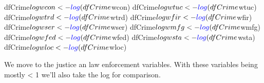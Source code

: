 \documentclass[]{article}
\newenvironment{Shaded}{}{}
\newcommand{\KeywordTok}[1]{\textcolor[rgb]{0.00,0.00,1.00}{#1}}
\newcommand{\NormalTok}[1]{#1}
\newcommand{\OperatorTok}[1]{#1}
\begin{document}
\begin{Shaded}
\begin{Highlighting}[]
\NormalTok{dfCrime}\OperatorTok{$}\NormalTok{logwcon<-}\KeywordTok{log}\NormalTok{(dfCrime}\OperatorTok{$}\NormalTok{wcon)}
\NormalTok{dfCrime}\OperatorTok{$}\NormalTok{logwtuc<-}\KeywordTok{log}\NormalTok{(dfCrime}\OperatorTok{$}\NormalTok{wtuc)}
\NormalTok{dfCrime}\OperatorTok{$}\NormalTok{logwtrd<-}\KeywordTok{log}\NormalTok{(dfCrime}\OperatorTok{$}\NormalTok{wtrd)}
\NormalTok{dfCrime}\OperatorTok{$}\NormalTok{logwfir<-}\KeywordTok{log}\NormalTok{(dfCrime}\OperatorTok{$}\NormalTok{wfir)}
\NormalTok{dfCrime}\OperatorTok{$}\NormalTok{logwser<-}\KeywordTok{log}\NormalTok{(dfCrime}\OperatorTok{$}\NormalTok{wser)}
\NormalTok{dfCrime}\OperatorTok{$}\NormalTok{logwmfg<-}\KeywordTok{log}\NormalTok{(dfCrime}\OperatorTok{$}\NormalTok{wmfg)}
\NormalTok{dfCrime}\OperatorTok{$}\NormalTok{logwfed<-}\KeywordTok{log}\NormalTok{(dfCrime}\OperatorTok{$}\NormalTok{wfed)}
\NormalTok{dfCrime}\OperatorTok{$}\NormalTok{logwsta<-}\KeywordTok{log}\NormalTok{(dfCrime}\OperatorTok{$}\NormalTok{wsta)}
\NormalTok{dfCrime}\OperatorTok{$}\NormalTok{logwloc<-}\KeywordTok{log}\NormalTok{(dfCrime}\OperatorTok{$}\NormalTok{wloc)}
\end{Highlighting}
\end{Shaded}

We move to the justice an law enforcement variables. With these
variables being mostly \textless{} 1 we'll also take the log for
comparison.
\end{document}
